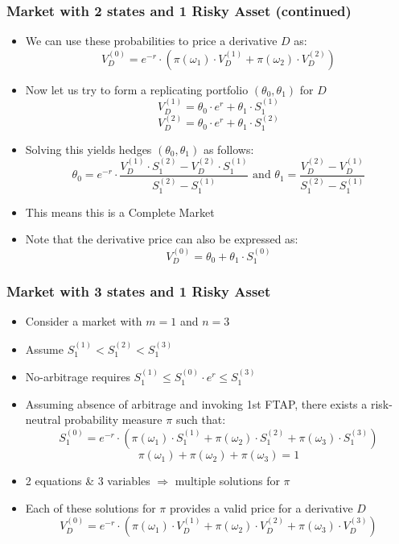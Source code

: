 \documentclass{beamer}
\begin{document}
\begin{frame}
\frametitle{Market with 2 states and 1 Risky Asset (continued)}
\begin{itemize}
\item We can use these probabilities to price a derivative $D$ as:
$$V_D^{(0)} = e^{-r} \cdot (\pi(\omega_1) \cdot V_D^{(1)} + \pi(\omega_2) \cdot V_D^{(2)})$$
\item Now let us try to form a replicating portfolio $(\theta_0, \theta_1)$ for $D$
$$V_D^{(1)} = \theta_0 \cdot e^r + \theta_1 \cdot S_1^{(1)}$$
$$V_D^{(2)} = \theta_0 \cdot e^r + \theta_1 \cdot S_1^{(2)}$$ 
\item Solving this yields hedges $(\theta_0, \theta_1)$ as follows:
$$\theta_0 = e^{-r} \cdot \frac {V_D^{(1)} \cdot S_1^{(2)} - V_D^{(2)} \cdot S_1^{(1)}} {S_1^{(2)} - S_1^{(1)}} \mbox{ and } \theta_1 = \frac {V_D^{(2)} - V_D^{(1)}} {S_1^{(2)} - S_1^{(1)}}$$
\item This means this is a Complete Market
\item Note that the derivative price can also be expressed as:
$$V_D^{(0)} = \theta_0 + \theta_1 \cdot S_1^{(0)}$$ 
\end{itemize}
\end{frame}

\begin{frame}
\frametitle{Market with 3 states and 1 Risky Asset}
\begin{itemize}
\item Consider a market with $m = 1$ and $n = 3$
\item Assume $S_1^{(1)} < S_1^{(2)} < S_1^{(3)}$
\item No-arbitrage requires $S_1^{(1)} \leq S_1^{(0)} \cdot e^r \leq S_1^{(3)}$
\item Assuming absence of arbitrage and invoking 1st FTAP, there exists a risk-neutral probability measure $\pi$ such that:
$$S_1^{(0)} = e^{-r} \cdot (\pi(\omega_1) \cdot S_1^{(1)} + \pi(\omega_2) \cdot S_1^{(2)} + \pi(\omega_3) \cdot S_1^{(3)})$$
$$\pi(\omega_1) + \pi(\omega_2) + \pi(\omega_3) = 1$$
\item 2 equations \& 3 variables $\Rightarrow$ multiple solutions for $\pi$
\item Each of these solutions for $\pi$ provides a valid price for a derivative $D$
$$V_D^{(0)} = e^{-r} \cdot (\pi(\omega_1) \cdot V_D^{(1)} + \pi(\omega_2) \cdot V_D^{(2)} + \pi(\omega_3) \cdot V_D^{(3)})$$
\end{itemize}
\end{frame}
\end{document}
